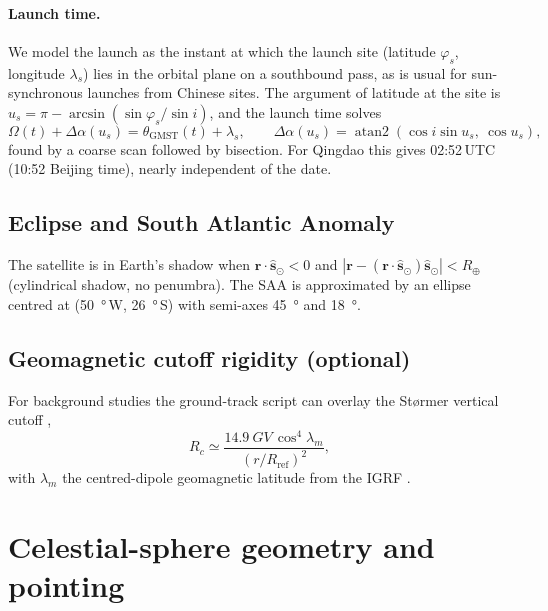 \documentclass[a4paper,fleqn]{cas-sc}
\newif\ifshowtodos
\newcommand{\todo}[1]{\ifshowtodos{\color{red!70!black}\textbf{[TODO:} #1\textbf{]}}\fi}
\newcommand{\RE}{R_{\oplus}}
\newcommand{\vect}[1]{\hat{\mathbf{#1}}}
\begin{document}
\paragraph{Launch time.} We model the launch as the instant at which the launch
site (latitude $\varphi_s$, longitude $\lambda_s$) lies in the orbital plane on
a southbound pass, as is usual for sun-synchronous launches from Chinese
sites. The argument of latitude at the site is
$u_s=\pi-\arcsin(\sin\varphi_s/\sin i)$, and the launch time solves
\begin{equation}
  \Omega(t)+\Delta\alpha(u_s) = \theta_{\mathrm{GMST}}(t)+\lambda_s,
  \qquad
  \Delta\alpha(u_s)=\operatorname{atan2}(\cos i\sin u_s,\ \cos u_s),
  \label{eq:launch}
\end{equation}
found by a coarse scan followed by bisection. For Qingdao this gives
02:52\,UTC (10:52 Beijing time), nearly independent of the date.
\todo{Discuss the offset between lift-off and orbit insertion.}

\subsection{Eclipse and South Atlantic Anomaly}
The satellite is in Earth's shadow when
$\mathbf{r}\cdot\vect{s}_\odot<0$ and
$|\mathbf{r}-(\mathbf{r}\cdot\vect{s}_\odot)\vect{s}_\odot|<\RE$
(cylindrical shadow, no penumbra). The SAA is approximated by an ellipse
centred at (\SI{50}{\degree}\,W, \SI{26}{\degree}\,S) with semi-axes
\SI{45}{\degree} and \SI{18}{\degree}. \todo{Replace with the operator's SAA
polygon or an AP9/AE9 flux contour \cite{Ginet2013}.}

\subsection{Geomagnetic cutoff rigidity (optional)}
For background studies the ground-track script can overlay the Størmer
vertical cutoff \cite{Stormer1955},
\begin{equation}
  R_c \simeq \frac{\SI{14.9}{GV}\,\cos^{4}\lambda_m}{(r/R_{\mathrm{ref}})^{2}},
  \label{eq:stormer}
\end{equation}
with $\lambda_m$ the centred-dipole geomagnetic latitude from the IGRF
\cite{IGRF14}. \todo{Decide whether to keep this subsection.}

\section{Celestial-sphere geometry and pointing}
\label{sec:sky}
\end{document}
